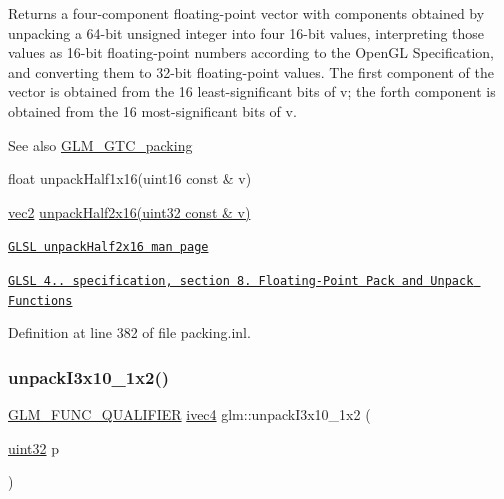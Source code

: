 Returns a four-\/component floating-\/point vector with components obtained by unpacking a 64-\/bit unsigned integer into four 16-\/bit values, interpreting those values as 16-\/bit floating-\/point numbers according to the Open\+GL Specification, and converting them to 32-\/bit floating-\/point values. The first component of the vector is obtained from the 16 least-\/significant bits of v; the forth component is obtained from the 16 most-\/significant bits of v.

\begin{DoxySeeAlso}{See also}
\hyperlink{group__gtc__packing}{G\+L\+M\+\_\+\+G\+T\+C\+\_\+packing} 

float unpack\+Half1x16(uint16 const \& v) 

\hyperlink{group__core__types_gaa1618f51db67eaa145db101d8c8431d8}{vec2} \hyperlink{group__core__func__packing_ga4051804cc2c930ba4ca73382b79edf1d}{unpack\+Half2x16(uint32 const \& v)} 

\href{http://www.opengl.org/sdk/docs/manglsl/xhtml/unpackHalf2x16.xml}{\tt G\+L\+SL unpack\+Half2x16 man page} 

\href{http://www.opengl.org/registry/doc/GLSLangSpec.4.20.8.pdf}{\tt G\+L\+SL 4.. specification, section 8. Floating-\/\+Point Pack and Unpack Functions} 
\end{DoxySeeAlso}


Definition at line 382 of file packing.\+inl.

\mbox{\label{group__gtc__packing_ga08bcd34cf9c34701d658dd861ee6e300}} 
\subsubsection{\texorpdfstring{unpack\+I3x10\+\_\+1x2()}{unpackI3x10\_1x2()}}
{\footnotesize\ttfamily \hyperlink{setup_8hpp_a33fdea6f91c5f834105f7415e2a64407}{G\+L\+M\+\_\+\+F\+U\+N\+C\+\_\+\+Q\+U\+A\+L\+I\+F\+I\+ER} \hyperlink{group__core__types_gaa4560ddc50320ea8f8a70d5c9c249fea}{ivec4} glm\+::unpack\+I3x10\+\_\+1x2 (\begin{DoxyParamCaption}\item[{\hyperlink{group__gtc__type__precision_ga202b6a53c105fcb7e531f9b443518451}{uint32}}]{p }\end{DoxyParamCaption})}

